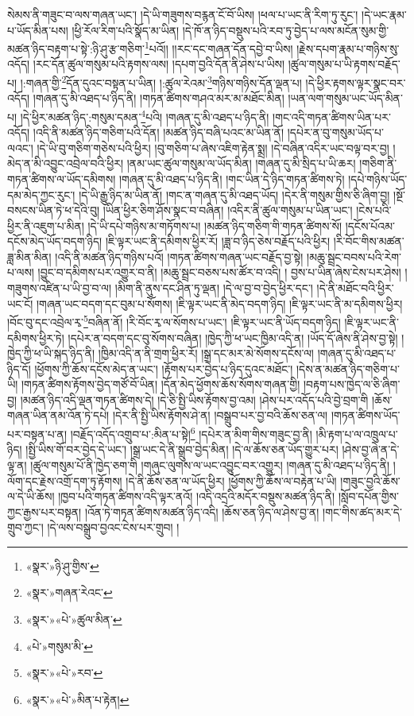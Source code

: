 སེམས་ནི་གཟུང་བ་ལས་གཞན་ཡང་། །དེ་ཡི་གཟུགས་བརྙན་ངོ་བོ་ཡིས། །ཕལ་པ་ཡང་ནི་རིག་ཏུ་རུང་། །དེ་ཡང་རྣམ་པ་ཡོད་མིན་པས། །ཕྱི་རོལ་རིག་པའི་སྣོད་མ་ཡིན། །དེ་ཁོ་ན་ཉིད་བསྡུས་པའི་རབ་ཏུ་བྱེད་པ་ལས་མངོན་སུམ་གྱི་མཚན་ཉིད་བརྟག་པ་སྟེ་:ཉི་ཤུ་རྩ་གཅིག་\footnote{«སྣར་»ཉི་ཤུ་གྱིས་}པའོ།། །།རང་དང་གཞན་དོན་དབྱེ་བ་ཡིས། །རྗེས་དཔག་རྣམ་པ་གཉིས་སུ་འདོད། །རང་དོན་ཚུལ་གསུམ་པའི་རྟགས་ལས། །དཔག་བྱའི་དོན་ནི་ཤེས་པ་ཡིས། །ཚུལ་གསུམ་པ་ཡི་རྟགས་བརྗོད་པ། །:གཞན་གྱི་\footnote{«སྣར་»གཞན་རེའང་}དོན་དུའང་བསྟན་པ་ཡིན། །:ཚུལ་རེའམ་\footnote{«སྣར་»«པེ་»ཚུལ་མིན་}གཉིས་གཉིས་དོན་ལྡན་པ། །དེ་ཕྱིར་རྟགས་ལྟར་སྣང་བར་འདོད། །གཞན་དུ་མི་འཐད་པ་ཉིད་ནི། །གཏན་ཚིགས་གཤའ་མར་མ་མཐོང་མིན། །ཡན་ལག་གསུམ་ཡང་ཡོད་མིན་པ། །དེ་ཕྱིར་མཚན་ཉིད་:གསུམ་དམན་\footnote{«པེ་»གསུམ་མི་}པའི། །གཞན་དུ་མི་འཐད་པ་ཉིད་ནི། །གང་འདི་གཏན་ཚིགས་ཡིན་པར་འདོད། །འདི་ནི་མཚན་ཉིད་གཅིག་པའི་དོན། །མཚན་ཉིད་བཞི་པའང་མ་ཡིན་ནོ། །དཔེར་ན་བུ་གསུམ་ཡོད་པ་ལའང་། །དེ་ཡི་བུ་གཅིག་གཅེས་པའི་ཕྱིར། །བུ་གཅིག་པ་ཞེས་འཇིག་རྟེན་སྨྲ། །དེ་བཞིན་འདིར་ཡང་བལྟ་བར་བྱ། །མེད་ན་མི་འབྱུང་འབྲེལ་བའི་ཕྱིར། །ནམ་ཡང་ཚུལ་གསུམ་ལ་ཡོད་མིན། །གཞན་དུ་མི་སྲིད་པ་ཡི་ཆར། །གཅིག་ནི་གཏན་ཚིགས་ལ་ཡོད་དམིགས། །གཞན་དུ་མི་འཐད་པ་ཉིད་ནི། །གང་ཡིན་དེ་ཉིད་གཏན་ཚིགས་ཏེ། །དཔེ་གཉིས་ཡོད་དམ་མེད་ཀྱང་རུང་། །དེ་ཡི་རྒྱུ་ཉིད་མ་ཡིན་ནོ། །གང་ན་གཞན་དུ་མི་འཐད་ཡོད། །དེར་ནི་གསུམ་གྱིས་ཅི་ཞིག་བྱ། །སྔོ་བསངས་ཡིན་ཏེ་ཕ་དེའི་བུ། །ཡིན་ཕྱིར་ཅིག་ཤོས་སྣང་བ་བཞིན། །འདིར་ནི་ཚུལ་གསུམ་པ་ཡིན་ཡང་། །ངེས་པའི་ཕྱིར་ནི་འཇུག་པ་མིན། །དེ་ཡི་དཔེ་གཉིས་མ་གཏོགས་པ། །མཚན་ཉིད་གཅིག་གི་གཏན་ཚིགས་སོ། །དངོས་པོའམ་དངོས་མེད་ཡོད་བདག་ཉིད། །ཇི་ལྟར་ཡང་ནི་དམིགས་ཕྱིར་རོ། །ཟླ་བ་ཉིད་ཅེས་བརྗོད་པའི་ཕྱིར། །རི་བོང་གིས་མཚན་ཟླ་མིན་མིན། །འདི་ནི་མཚན་ཉིད་གཉིས་པའོ། །གཏན་ཚིགས་གཞན་ཡང་བརྗོད་བྱ་སྟེ། །མཆུ་སྦྲང་བབས་པའི་རེག་པ་ལས། །བྱུང་བ་དམིགས་པར་འགྱུར་བ་ནི། །མཆུ་སྦྲང་བཅས་པས་ཚོར་བ་འདི། །
བྱས་པ་ཡིན་ཞེས་ངེས་པར་ཤེས། །གཟུགས་འཛིན་པ་ཡི་བྱ་བ་ལ། །མིག་ནི་ནུས་དང་ཤིན་ཏུ་ལྡན། །དེ་ལ་བྱ་བ་བྱེད་ཕྱིར་དང་། །དེ་ནི་མཐོང་བའི་ཕྱིར་ཡང་ངོ། །གཞན་ཡང་བདག་དང་བུམ་པ་སོགས། །ཇི་ལྟར་ཡང་ནི་མེད་བདག་ཉིད། །ཇི་ལྟར་ཡང་ནི་མ་དམིགས་ཕྱིར། །བོང་བུ་དང་འབྲེལ་རྭ་\footnote{«སྣར་»«པེ་»རབ་}བཞིན་ནོ། །རི་བོང་རྭ་ལ་སོགས་པ་ཡང་། །ཇི་ལྟར་ཡང་ནི་ཡོད་བདག་ཉིད། །ཇི་ལྟར་ཡང་ནི་དམིགས་ཕྱིར་ཏེ། །དཔེར་ན་བདག་དང་བུ་སོགས་བཞིན། །ཁྱེད་ཀྱི་ཕ་ཡང་ཁྱིམ་འདི་ན། །ཡོད་དོ་ཞེས་ནི་ཤེས་བྱ་སྟེ། །ཁྱེད་ཀྱི་ཕ་ཡི་སྐད་ཉིད་ནི། །ཁྱིམ་འདི་ན་ནི་གྲག་ཕྱིར་རོ། །སྒྲ་དང་མར་མེ་སོགས་དངོས་ལ། །གཞན་དུ་མི་འཐད་པ་ཉིད་དོ། །ཕྱོགས་ཀྱི་ཆོས་དངོས་མེད་ན་ཡང་། །རྟོགས་པར་བྱེད་པ་ཉིད་དུའང་མཐོང་། །དེས་ན་མཚན་ཉིད་གཅིག་པ་ཡི། །གཏན་ཚིགས་རྟོགས་བྱེད་གཙོ་བོ་ཡིན། །དོན་མེད་ཕྱོགས་ཆོས་སོགས་གཞན་གྱི། །བརྟག་པས་ཁྱེད་ལ་ཅི་ཞིག་བྱ། །མཚན་ཉིད་འདི་ལྡན་གཏན་ཚིགས་དེ། །དེ་ཅི་སྤྱི་ཡིས་རྟོགས་བྱ་འམ། །ཤེས་པར་འདོད་པའི་བྱེ་བྲག་གི །ཆོས་གཞན་ཡིན་ནམ་འོན་ཏེ་དཔེ། །དེར་ནི་སྤྱི་ཡིས་རྟོགས་ཤེ་ན། །བསྒྲུབ་པར་བྱ་བའི་ཆོས་ཅན་ལ། །གཏན་ཚིགས་ཡོད་པར་བསྟན་པ་ན། །བརྗོད་འདོད་འགྲུབ་པ་:མིན་པ་སྟེ།\footnote{«སྣར་»«པེ་»མིན་པ་རྟེན།} །དཔེར་ན་མིག་གིས་གཟུང་བྱ་ནི། །མི་རྟག་པ་ལ་འཁྲུལ་པ་ཉིད། །སྤྱི་ཡིས་གོ་བར་བྱེད་དེ་ཡང་། །སྒྲ་ཡང་དེ་ནི་སྒྲུབ་བྱེད་མིན། །དེ་ལ་ཆོས་ཅན་ཡོད་གྱུར་པར། །ཤེས་བྱ་ཞེ་ན་དེ་ལྟ་ན། །ཚུལ་གསུམ་པོ་ནི་ཁྱེད་ཅག་གི །གཞུང་ལུགས་ལ་ཡང་འབྱུང་བར་འགྱུར། །གཞན་དུ་མི་འཐད་པ་ཉིད་ནི། །ལོག་དང་རྗེས་འགྲོ་དག་ཏུ་རྟོགས། །དེ་ནི་ཆོས་ཅན་ལ་ཡོད་ཕྱིར། །ཕྱོགས་ཀྱི་ཆོས་ལ་བརྟེན་པ་ཡི། །གཟུང་བྱའི་ཆོས་ལ་དེ་ཡི་ཆོས། །ཁྱབ་པའི་གཏན་ཚིགས་འདི་ལྟར་ནའོ། །འདི་འདྲའི་མདོར་བསྡུས་མཚན་ཉིད་ནི། །སློབ་དཔོན་གྱིས་ཀྱང་རྒྱས་པར་བསྟན། །འོན་ཏེ་གཏན་ཚིགས་མཚན་ཉིད་འདི། །ཆོས་ཅན་ཉིད་ལ་ཤེས་བྱ་ན། །གང་གིས་ཚད་མར་དེ་གྲུབ་ཀྱང་། །དེ་ལས་བསྒྲུབ་བྱའང་ངེས་པར་གྲུབ། །
